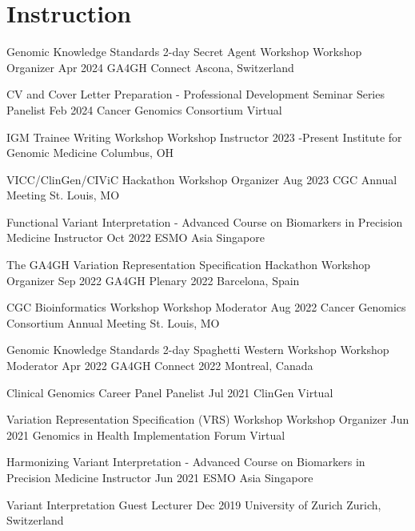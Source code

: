 \documentclass[10pt]{article} %
\begin{document}

\section{Instruction}

\instruction
{Genomic Knowledge Standards 2-day Secret Agent Workshop}
{Workshop Organizer}
{Apr 2024}{}
{GA4GH Connect}
{Ascona, Switzerland}

\instruction
{CV and Cover Letter Preparation - Professional Development Seminar Series}
{Panelist}
{Feb 2024}{}
{Cancer Genomics Consortium}
{Virtual}

\instruction
{IGM Trainee Writing Workshop}
{Workshop Instructor}
{2023 -}{Present}
{Institute for Genomic Medicine}
{Columbus, OH}

\instruction
{VICC/ClinGen/CIViC Hackathon}
{Workshop Organizer}
{Aug 2023}{}
{CGC Annual Meeting}
{St. Louis, MO}

\instruction
{Functional Variant Interpretation - Advanced Course on Biomarkers in Precision Medicine}
{Instructor}
{Oct 2022}{}
{ESMO Asia}
{Singapore}

\instruction
{The GA4GH Variation Representation Specification Hackathon}
{Workshop Organizer}
{Sep 2022}{}
{GA4GH Plenary 2022}
{Barcelona, Spain}

\instruction
{CGC Bioinformatics Workshop}
{Workshop Moderator}
{Aug 2022}{}
{Cancer Genomics Consortium Annual Meeting}
{St. Louis, MO}

\instruction
{Genomic Knowledge Standards 2-day Spaghetti Western Workshop}
{Workshop Moderator}
{Apr 2022}{}
{GA4GH Connect 2022}
{Montreal, Canada}

\instruction
{Clinical Genomics Career Panel}
{Panelist}
{Jul 2021}{}
{ClinGen}
{Virtual}

\instruction
{Variation Representation Specification (VRS) Workshop}
{Workshop Organizer}
{Jun 2021}{}
{Genomics in Health Implementation Forum}
{Virtual}

\instruction
{Harmonizing Variant Interpretation - Advanced Course on Biomarkers in Precision Medicine}
{Instructor}
{Jun 2021}{}
{ESMO Asia}
{Singapore}

\instruction
{Variant Interpretation}
{Guest Lecturer}
{Dec 2019}{}
{University of Zurich}
{Zurich, Switzerland}
\end{document}
